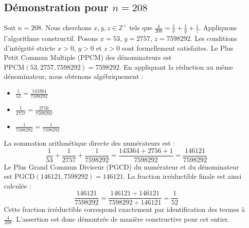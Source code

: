 \documentclass[11pt,a4paper]{article}
\begin{document}
\subsection{Démonstration pour $n = 208$}
Soit $n = 208$. Nous cherchons $x, y, z \in \mathbb{Z}^{+}$ tels que $\frac{4}{208} = \frac{1}{x} + \frac{1}{y} + \frac{1}{z}$.
Appliquons l'algorithme constructif. Posons $x = 53$, $y = 2757$, $z = 7598292$.
Les conditions d'intégrité stricte $x > 0$, $y > 0$ et $z > 0$ sont formellement satisfaites.
Le Plus Petit Commun Multiple (PPCM) des dénominateurs est $\text{PPCM}(53, 2757, 7598292) = 7598292$.
En appliquant la réduction au même dénominateur, nous obtenons algébriquement :
\begin{itemize}
    \item $\frac{1}{53} = \frac{143364}{7598292}$
    \item $\frac{1}{2757} = \frac{2756}{7598292}$
    \item $\frac{1}{7598292} = \frac{1}{7598292}$
\end{itemize}
La sommation arithmétique directe des numérateurs est :
$$ \frac{1}{53} + \frac{1}{2757} + \frac{1}{7598292} = \frac{143364 + 2756 + 1}{7598292} = \frac{146121}{7598292} $$
Le Plus Grand Commun Diviseur (PGCD) du numérateur et du dénominateur est $\text{PGCD}(146121, 7598292) = 146121$.
La fraction irréductible finale est ainsi calculée :
$$ \frac{146121}{7598292} = \frac{146121 \div 146121}{7598292 \div 146121} = \frac{1}{52} $$
Cette fraction irréductible correspond exactement par identification des termes à $\frac{4}{208}$. L'assertion est donc démontrée de manière constructive pour cet entier.
\end{document}
